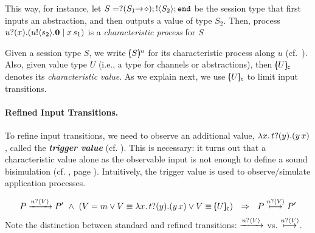 This way, for instance, let $S = ? (S_1\!\! \rightarrow\! \diamond) ; ! \langle S_2 \rangle ; \mathtt{end}$
be the session type that first
inputs an abstraction, %
and then outputs a value of type $S_2$.
Then, process $u ? (x) . (u ! \langle s_2 \rangle . \mathbf{0} \;|\; x\, {s_1})$
is a \emph{characteristic process} for $S$ 


Given a session type $S$, we write $[\!\!(S)\!\!]^{u} $
for its characteristic process along   $u$
(cf.~).
Also, %
given value type $U$ (i.e., a type for channels or abstractions), then
$[\!\!(U)\!\!]_{\mathsf{c}}$ denotes its \emph{characteristic value}.
As we explain next, we use 
$[\!\!(U)\!\!]_{\mathsf{c}}$
 to limit input transitions.

\paragraph{Refined Input Transitions.}
To refine  input transitions, we need to observe 
an additional value, 
$\lambda {x}.\,t ? (y) . (y\, {{x}})$, 
called the {\bf\em trigger value} (cf. ). 
This is necessary: it turns out
that a characteristic value 
alone as the observable input 
is not enough to define a sound bisimulation (cf. , page \pageref{ex:motivation}).
Intuitively, the trigger value is used
to observe/simulate application processes.

$$
{
~~P \xrightarrow{n ? \langle V \rangle} P' ~\land~ (V = m \vee V \equiv \lambda {x}.\,t ? (y) . (y\, {{x}}) \vee  V \equiv [\!\!(U)\!\!]_{\mathsf{c}})
  ~~\Rightarrow~~
P \stackrel{n ? \langle V \rangle}{\longmapsto} P'~~
}
$$
Note the distinction between standard and refined transitions: $\xrightarrow{n ? \langle V \rangle}$ vs. $\stackrel{n ? \langle V \rangle}{\longmapsto}$.


